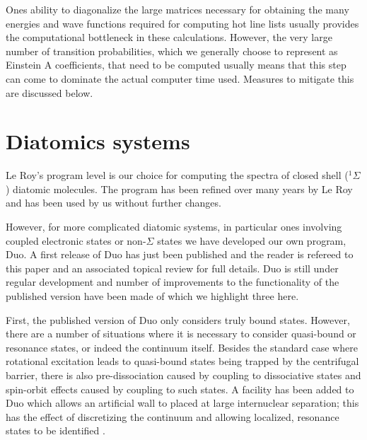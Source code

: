 \documentclass[12pt]{article}
\newcommand{\2}{$_{2}$}
\newcommand{\3}{$_{3}$}
\newcommand{\4}{$_{4}$}
\begin{document}
Ones ability to diagonalize the large matrices necessary for obtaining
the many energies and wave functions required for computing hot line lists
usually provides the computational bottleneck in these calculations.
However, the very large number of transition probabilities, which we
generally choose to represent as Einstein A coefficients, that need to be
computed usually means that this step can come to dominate the
actual computer
time used. Measures to mitigate this are discussed below.


\section{Diatomics systems}

Le Roy's program level \cite{lr07} is our choice for computing the spectra
of closed shell ($^1\Sigma$) diatomic molecules. The program has
been refined over many years by Le Roy and has been used by us without
further changes.

However, for more complicated diatomic systems, in particular ones
involving coupled electronic states or non-$\Sigma$ states we have
developed our own program, {\sc Duo}. A first release of {\sc Duo} has
just been published \cite{jt609} and the reader is refereed to this
paper and an associated topical review \cite{jt632} for full details.
{\sc Duo} is still under regular development and number of
improvements to the functionality of the published version
have been made of which we
highlight three here.

First, the published version of {\sc Duo} only considers truly bound
states. However, there are a number of situations where it is necessary
to consider quasi-bound or resonance states, or indeed the continuum
itself. Besides the standard case where rotational excitation leads
to quasi-bound states being trapped by the centrifugal barrier, there
is also pre-dissociation caused by coupling to dissociative states
and spin-orbit effects caused by coupling to such states.
A facility has been added to {\sc Duo} which allows an artificial wall to
placed at large internuclear separation; this has the effect of
discretizing the continuum and allowing localized, resonance states
to be identified \cite{fraser}.
\end{document}
